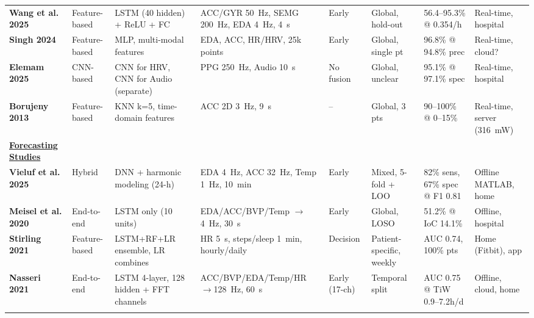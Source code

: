 \begin{landscape}
\begin{table}[htbp]
\begin{tabularx}{\linewidth}{@{} l X X X X X X X @{}}
\textbf{Wang et al. 2025} & Feature-based & LSTM (40 hidden) + ReLU + FC & ACC/GYR 50~Hz, SEMG 200~Hz, EDA 4~Hz, 4~s & Early & Global, hold-out & 56.4--95.3\% @ 0.354/h & Real-time, hospital \\
\addlinespace

\textbf{Singh 2024} & Feature-based & MLP, multi-modal features & EDA, ACC, HR/HRV, 25k points & Early & Global, single pt & 96.8\% @ 94.8\% prec & Real-time, cloud? \\
\addlinespace

\textbf{Elemam 2025} & CNN-based & CNN for HRV, CNN for Audio (separate) & PPG 250~Hz, Audio 10~s & No fusion & Global, unclear & 95.1\% @ 97.1\% spec & Real-time, hospital \\
\addlinespace

\textbf{Borujeny 2013} & Feature-based & KNN k=5, time-domain features & ACC 2D 3~Hz, 9~s & -- & Global, 3 pts & 90--100\% @ 0--15\% & Real-time, server (316~mW) \\
\addlinespace

\textbf{\underline{Forecasting Studies}} \\
\addlinespace

\textbf{Vieluf et al. 2025} & Hybrid & DNN + harmonic modeling (24-h) & EDA 4~Hz, ACC 32~Hz, Temp 1~Hz, 10~min & Early & Mixed, 5-fold + LOO & 82\% sens, 67\% spec @ F1 0.81 & Offline MATLAB, home \\
\addlinespace

\textbf{Meisel et al. 2020} & End-to-end & LSTM only (10 units) & EDA/ACC/BVP/Temp $\to$4~Hz, 30~s & Early & Global, LOSO & 51.2\% @ IoC 14.1\% & Offline, hospital \\
\addlinespace

\textbf{Stirling 2021} & Feature-based & LSTM+RF+LR ensemble, LR combines & HR 5~s, steps/sleep 1~min, hourly/daily & Decision & Patient-specific, weekly & AUC 0.74, 100\% pts & Home (Fitbit), app \\
\addlinespace

\textbf{Nasseri 2021} & End-to-end & LSTM 4-layer, 128 hidden + FFT channels & ACC/BVP/EDA/Temp/HR $\to$128~Hz, 60~s & Early (17-ch) & Temporal split & AUC 0.75 @ TiW 0.9--7.2h/d & Offline, cloud, home \\
\addlinespace


\end{tabularx}
\end{table}
\end{landscape}
